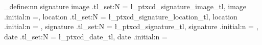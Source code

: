 \usepackage[]{geometry}
\usepackage{graphicx}


\ExplSyntaxOn
\makeatletter
\newcommand*{\Source}[1]{\par \vskip \abovecaptionskip\parbox{\linewidth}{\@hangfrom{Quelle:~}{#1}}\par\vskip\belowcaptionskip}

\keys_define:nn {signature} {
	image .tl_set:N = \l_ptxcd_signature_image_tl,
	image .initial:n =,
	location .tl_set:N = \l_ptxcd_signature_location_tl,
	location .initial:n = ,
	signature .tl_set:N = \l_ptxcd_signature_tl,
	signature .initial:n = \@author,
	date .tl_set:N = \l_ptxcd_date_tl,
	date .initial:n = \@date
}


\newcommand*{\SignatureBox}[2][5cm]{\parbox[t]{#1}{\centering
		\rule{\linewidth}{.3pt}\\\makebox[0pt][c]{#2}}
}

\makeatother
\ExplSyntaxOff

\usepackage{anyfontsize}
\usepackage{setspace}



\usepackage{scrlayer-scrpage}
\clearpairofpagestyles
\cfoot[\pagemark]{\pagemark}



\usepackage[ngerman]{babel}
\usepackage{microtype}
\usepackage[babel]{csquotes}

\usepackage[style=apa]{biblatex}
